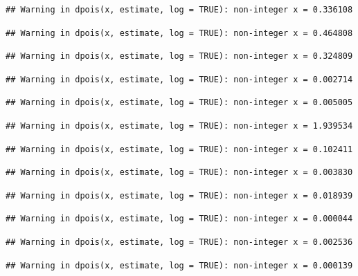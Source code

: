 \documentclass[]{article}
\begin{document}
\begin{verbatim}
## Warning in dpois(x, estimate, log = TRUE): non-integer x = 0.336108
\end{verbatim}

\begin{verbatim}
## Warning in dpois(x, estimate, log = TRUE): non-integer x = 0.464808
\end{verbatim}

\begin{verbatim}
## Warning in dpois(x, estimate, log = TRUE): non-integer x = 0.324809
\end{verbatim}

\begin{verbatim}
## Warning in dpois(x, estimate, log = TRUE): non-integer x = 0.002714
\end{verbatim}

\begin{verbatim}
## Warning in dpois(x, estimate, log = TRUE): non-integer x = 0.005005
\end{verbatim}

\begin{verbatim}
## Warning in dpois(x, estimate, log = TRUE): non-integer x = 1.939534
\end{verbatim}

\begin{verbatim}
## Warning in dpois(x, estimate, log = TRUE): non-integer x = 0.102411
\end{verbatim}

\begin{verbatim}
## Warning in dpois(x, estimate, log = TRUE): non-integer x = 0.003830
\end{verbatim}

\begin{verbatim}
## Warning in dpois(x, estimate, log = TRUE): non-integer x = 0.018939
\end{verbatim}

\begin{verbatim}
## Warning in dpois(x, estimate, log = TRUE): non-integer x = 0.000044
\end{verbatim}

\begin{verbatim}
## Warning in dpois(x, estimate, log = TRUE): non-integer x = 0.002536
\end{verbatim}

\begin{verbatim}
## Warning in dpois(x, estimate, log = TRUE): non-integer x = 0.000139
\end{verbatim}
\end{document}
